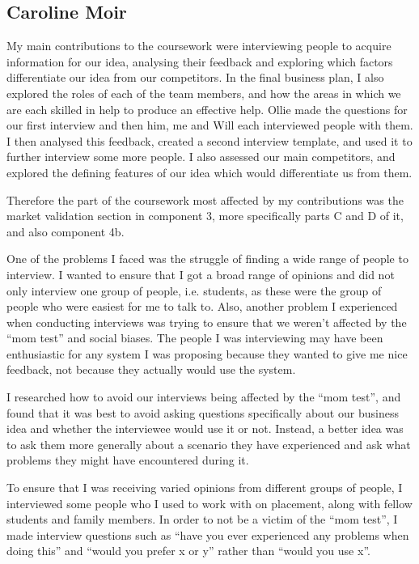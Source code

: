 \documentclass[10pt,a4paper]{article}
\begin{document}
\begin{appendices}
\subsection{Caroline Moir}
My main contributions to the coursework were interviewing people to acquire information for our idea, analysing their feedback and exploring which factors differentiate our idea from our competitors. In the final business plan, I also explored the roles of each of the team members, and how the areas in which we are each skilled in help to produce an effective help. Ollie made the questions for our first interview and then him, me and Will each interviewed people with them. I then analysed this feedback, created a second interview template, and used it to further interview some more people. I also assessed our main competitors, and explored the defining features of our idea which would differentiate us from them.

Therefore the part of the coursework most affected by my contributions was the market validation section in component 3, more specifically parts C and D of it, and also component 4b.

One of the problems I faced was the struggle of finding a wide range of people to interview. I wanted to ensure that I got a broad range of opinions and did not only interview one group of people, i.e. students, as these were the group of people who were easiest for me to talk to. Also, another problem I experienced when conducting interviews was trying to ensure that we weren't affected by the ``mom test'' and social biases. The people I was interviewing may have been enthusiastic for any system I was proposing because they wanted to give me nice feedback, not because they actually would use the system.

I researched how to avoid our interviews being affected by the ``mom test'', and found that it was best to avoid asking questions specifically about our business idea and whether the interviewee would use it or not. Instead, a better idea was to ask them more generally about a scenario they have experienced and ask what problems they might have encountered during it.

To ensure that I was receiving varied opinions from different groups of people, I interviewed some people who I used to work with on placement, along with fellow students and family members. In order to not be a victim of the ``mom test'', I made interview questions such as ``have you ever experienced any problems when doing this'' and ``would you prefer x or y'' rather than ``would you use x''.


\end{appendices}
\end{document}
